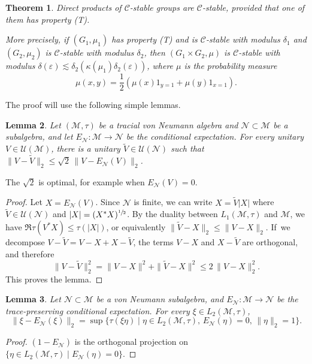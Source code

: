 \documentclass[10pt]{amsart}
\theoremstyle{plain}
\newtheorem{theorem}{Theorem}[section]
\newtheorem{lemma}[theorem]{Lemma}
\theoremstyle{definition}
\newcommand{\cM}{\mathcal{M}}
\newcommand{\cN}{\mathcal{N}}
\newcommand{\vn}{\mathcal{C}}
\newcommand{\cU}{\mathcal{U}}
\begin{document}
\begin{theorem}\label{thm:stability_direct_product} Direct products of $\vn$-stable groups are $\vn$-stable, provided that one of them has property (T).

More precisely, if $(G_1,\mu_1)$ has property (T) and is $\vn$-stable with modulus $\delta_1$ and $(G_2,\mu_2)$ is $\vn$-stable with modulus $\delta_2$, then $(G_1 \times G_2,\mu)$ is $\vn$-stable with modulus $\delta(\varepsilon) \lesssim \delta_2(\kappa(\mu_1) \delta_2(\varepsilon))$, where $\mu$ is the probability measure
\[
\mu(x,y) = \frac{1}{2}(\mu(x) 1_{y=1}+\mu(y) 1_{x=1}).
\]
\end{theorem}
The proof will use the following simple lemmas.
\begin{lemma}\label{eq:almost-unitary_close_to_unitary} Let $(\cM,\tau)$ be a tracial von Neumann algebra and $\cN\subset\cM$ be a subalgebra, and let $E_\cN:\cM \to \cN$ be the conditional expectation. For every unitary $V \in \cU(\cM)$, there is a unitary $\tilde{V}\in\cU(\cN)$ such that $\|V-\tilde{V}\|_2 \leq \sqrt{2}\, \|V-E_\cN(V)\|_2$.
\end{lemma}
The $\sqrt{2}$ is optimal, for example when $E_\cN(V)=0$.
\begin{proof} Let $X = E_\cN(V)$. Since $\cN$ is finite, we can write $X=\tilde{V}|X|$ where $\tilde{V} \in\cU(\cN)$ and $|X|=(X^*X)^{\sfrac 1 2}$. By the duality between $L_1(\cM,\tau)$ and $\cM$, we have $\Re \tau(V^*X) \leq\tau(|X|)$, or equivalently $\|\tilde{V}-X\|_2 \leq \|V-X\|_2$. If~we decompose $V-\tilde{V} = V-X + X-\tilde{V}$, the terms $V-X$ and $X-\tilde{V}$ are orthogonal, and therefore
\[
\|V-\tilde{V}\|_2^2 = \|V-X\|^2 + \|\tilde{V}-X\|^2 \leq 2\,\|V-X\|_2^2.
\]
This proves the lemma.
\end{proof}
\begin{lemma}\label{eq:norm_of_conditional_exp} Let $\cN\subset\cM$ be a von Neumann subalgebra, and $E_\cN:\cM\to\cN$ be the trace-preserving conditional expectation. For every $\xi \in L_2(\cM,\tau)$,
\[
\|\xi - E_\cN(\xi)\|_2 = \sup\{\tau(\xi \eta) \mid \eta \in L_2(\cM,\tau),\, E_\cN(\eta)=0,\,\|\eta\|_2 = 1\}.
\]
\end{lemma}
\begin{proof}
$(1-E_\cN)$ is the orthogonal projection on $\{\eta \in L_2(\cM,\tau) \mid E_\cN(\eta)=0\}$.
\end{proof}
\end{document}
